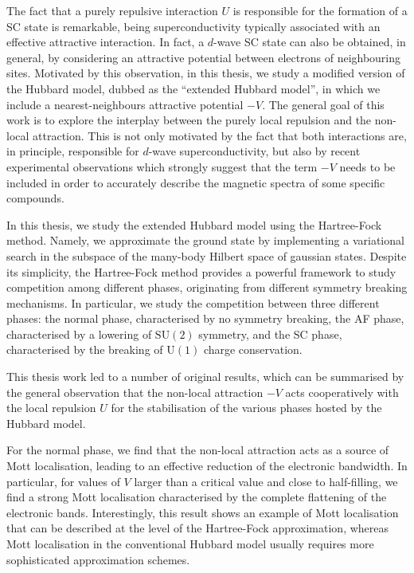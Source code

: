 \documentclass[a4paper]{memoir}
\begin{document}
The fact that a purely repulsive interaction $U$ is responsible for the formation of a SC state is remarkable, being superconductivity typically associated with an effective attractive interaction. In fact, a $d$-wave SC state can also be obtained, in general, by considering an attractive potential between electrons of neighbouring sites. Motivated by this observation, in this thesis, we study a modified version of the Hubbard model, dubbed as the ``extended Hubbard model'', in which we include a nearest-neighbours attractive potential $-V$. The general goal of this work is to explore the interplay between the purely local repulsion and the non-local attraction. This is not only motivated by the fact that both interactions are, in principle, responsible for $d$-wave superconductivity, but also by recent experimental observations which strongly suggest that the term $-V$ needs to be included in order to accurately describe the magnetic spectra of some specific compounds.

In this thesis, we study the extended Hubbard model using the Hartree-Fock method. Namely, we approximate the ground state by implementing a variational search in the subspace of the many-body Hilbert space of gaussian states. Despite its simplicity, the Hartree-Fock method provides a powerful framework to study competition among different phases, originating from different symmetry breaking mechanisms. In particular, we study the competition between three different phases: the normal phase, characterised by no symmetry breaking, the AF phase, characterised by a lowering of $\mathrm{SU} (2)$ symmetry, and the SC phase, characterised by the breaking of $\mathrm{U}(1)$ charge conservation. 

This thesis work led to a number of original results, which can be summarised by the general observation that the non-local attraction $-V$ acts cooperatively with the local repulsion $U$ for the stabilisation of the various phases hosted by the Hubbard model.

For the normal phase, we find that the non-local attraction acts as a source of Mott
localisation, leading to an effective reduction of the electronic bandwidth. In particular, for values of $V$ larger than a critical value and close to half-filling, we find a strong Mott localisation characterised by the complete flattening of the electronic bands. Interestingly, this result shows an example of Mott localisation that can be described at the level of the Hartree-Fock approximation, whereas Mott localisation in the conventional Hubbard model usually requires more sophisticated approximation schemes.
\end{document}
